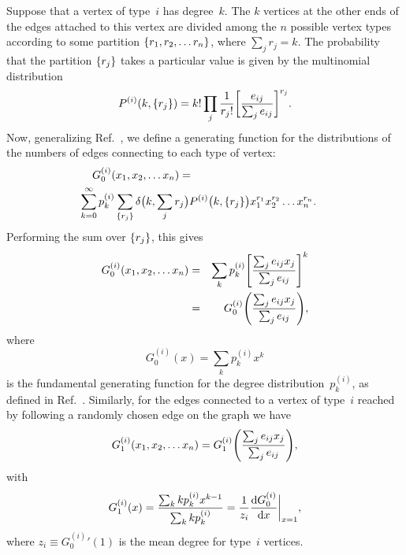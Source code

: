 \documentclass[twocolumn,pre]{revtex4}
\begin{document}
Suppose that a vertex of type~$i$ has degree~$k$.  The $k$ vertices at the
other ends of the edges attached to this vertex are divided among the $n$
possible vertex types according to some partition $\lbrace r_1,r_2,\ldots
r_n\rbrace$, where $\sum_j r_j=k$.  The probability that the partition
$\lbrace r_j\rbrace$ takes a particular value is given by the multinomial
distribution
\begin{equation}
P^{(i)}(k,\lbrace r_j\rbrace) = k! \prod_j {1\over r_j!}
  \biggl[{e_{ij}\over\sum_j e_{ij}}\biggr]^{r_j}.
\end{equation}
Now, generalizing Ref.~, we define a generating function
for the distributions of the numbers of edges connecting to each type of
vertex:
\begin{eqnarray}
G_0^{(i)}(x_1,x_2,\ldots x_n) &=& \nonumber\\
 & & \hspace{-11em} \sum_{k=0}^\infty p_k^{(i)} \sum_{\set{r_j}}
\delta\bigl(k,\sum_j r_j\bigr) P^{(i)}\bigl(k,\set{r_j}\bigr)
x_1^{r_1} x_2^{r_2}\ldots x_n^{r_n}.
\end{eqnarray}
Performing the sum over $\lbrace r_j\rbrace$, this gives
\begin{eqnarray}
G_0^{(i)}(x_1,x_2,\ldots x_n) &=& \sum_k p_k^{(i)} \Biggl[ {\sum_j e_{ij}
  x_j\over\sum_j e_{ij}} \Biggr]^k\nonumber\\ &=& G_0^{(i)}\Biggl( {\sum_j
  e_{ij} x_j\over\sum_j e_{ij}} \Biggr),
\label{defsg0xx}
\end{eqnarray}
where
\begin{equation}
G_0^{(i)}(x) = \sum_k p_k^{(i)} x^k
\end{equation}
is the fundamental generating function for the degree
distribution~$p_k^{(i)}$, as defined in Ref.~.
Similarly, for the edges connected to a vertex of type~$i$ reached by
following a randomly chosen edge on the graph we have
\begin{equation}
G_1^{(i)}(x_1,x_2,\ldots x_n) = G_1^{(i)}\Biggl( {\sum_j e_{ij}
  x_j\over\sum_j e_{ij}} \Biggr),
\label{defsg0x}
\end{equation}
with
\begin{equation}
G_1^{(i)}(x) = {\sum_k k p_k^{(i)} x^{k-1}\over\sum_k k p_k^{(i)}}
             = {1\over z_i} {{\rm d} G_0^{(i)}\over{\rm d} x}\biggr|_{x=1},
\end{equation}
where $z_i\equiv {G_0^{(i)}}'(1)$ is the mean degree for type~$i$ vertices.
\end{document}
